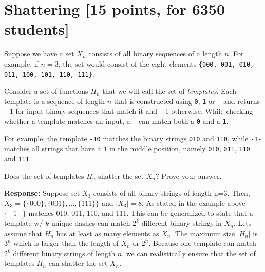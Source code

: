 \section{Shattering [15 points, for 6350 students]}
\label{sec:shattering}

Suppose we have a set $X_n$ consists of all binary sequences of a length $n$.
For example, if $n=3$, the set would consist of the eight elements
\texttt{\{000, 001, 010, 011, 100, 101, 110, 111\}}.

Consider a set of functions $H_n$ that we will call the set of {\em
  templates}. Each template is a sequence of length $n$ that is constructed
using {\tt 0}, {\tt 1} or {\tt -} and returns $+1$ for input binary sequences
that match it and $-1$ otherwise. While checking whether a template matches an
input, a {\tt -} can match both a {\tt 0} and a {\tt 1}.

For example, the template {\tt -10} matches the binary strings {\tt 010} and
{\tt 110}, while {\tt -1-} matches all strings that have a {\tt 1} in the middle
position, namely {\tt 010}, {\tt 011}, {\tt 110} and {\tt 111}.

Does the set of templates $H_n$ shatter the set $X_n$? Prove your answer. \newline

\textbf{Response:}
Suppose set $X_3$ consists of all binary strings of length n=3. Then, $X_3=\{\{000\}, \{001\}, ...,\{111\}\}$ and $|X_3|=8$. As stated in the example above $\{-1-\}$ matches 010, 011, 110, and 111. This can be generalized to state that a template w/ $k$ unique dashes can match $2^k$ different binary strings in $X_n$. Lets assume that $H_n$ has at least as many elements as $X_n$. The maximum size $|H_n|$ is $3^n$ which is larger than the length of $X_n$ or $2^n$. Because one template can match $2^k$ different binary strings of length $n$, we can realistically ensure that the set of templates $H_n$ can shatter the set $X_n$.